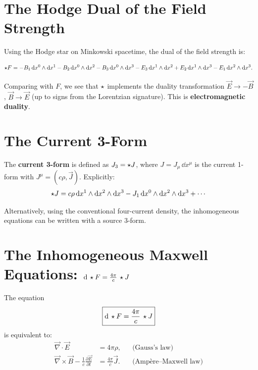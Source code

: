 \section{The Hodge Dual of the Field Strength}

Using the Hodge star on Minkowski spacetime, the dual of the field strength is:

\begin{equation}
\star F = -B_1\,\mathrm{d} x^0 \wedge \mathrm{d} x^1 - B_2\,\mathrm{d} x^0 \wedge \mathrm{d} x^2 - B_3\,\mathrm{d} x^0 \wedge \mathrm{d} x^3 - E_3\,\mathrm{d} x^1 \wedge \mathrm{d} x^2 + E_2\,\mathrm{d} x^1 \wedge \mathrm{d} x^3 - E_1\,\mathrm{d} x^2 \wedge \mathrm{d} x^3.
\end{equation}

Comparing with $F$, we see that $\star$ implements the duality transformation $\vec{E} \to -\vec{B}$, $\vec{B} \to \vec{E}$ (up to signs from the Lorentzian signature). This is \textbf{electromagnetic duality}.

\section{The Current 3-Form}

\begin{definition}
The \textbf{current 3-form} is defined as $J_3 = \star J$, where $J = J_\mu\,\dd x^\mu$ is the current 1-form with $J^\mu = (c\rho, \vec{J})$. Explicitly:
\begin{equation}
\star J = c\rho\,\mathrm{d} x^1 \wedge \mathrm{d} x^2 \wedge \mathrm{d} x^3 - J_1\,\mathrm{d} x^0 \wedge \mathrm{d} x^2 \wedge \mathrm{d} x^3 + \cdots
\end{equation}
\end{definition}

Alternatively, using the conventional four-current density, the inhomogeneous equations can be written with a source 3-form.

\section{The Inhomogeneous Maxwell Equations: $\mathrm{d}\,\star F = \frac{4\pi}{c}\,\star J$}

\begin{theorem}
The equation
\begin{equation}
\boxed{\mathrm{d}\,\star F = \frac{4\pi}{c}\,\star J}
\end{equation}
is equivalent to:
\begin{align}
\vec{\nabla}\cdot\vec{E} &= 4\pi\rho, & &\text{(Gauss's law)} \\
\vec{\nabla}\times\vec{B} - \frac{1}{c}\frac{\partial\vec{E}}{\partial t} &= \frac{4\pi}{c}\vec{J}. & &\text{(Amp\`ere--Maxwell law)}
\end{align}
\end{theorem}

